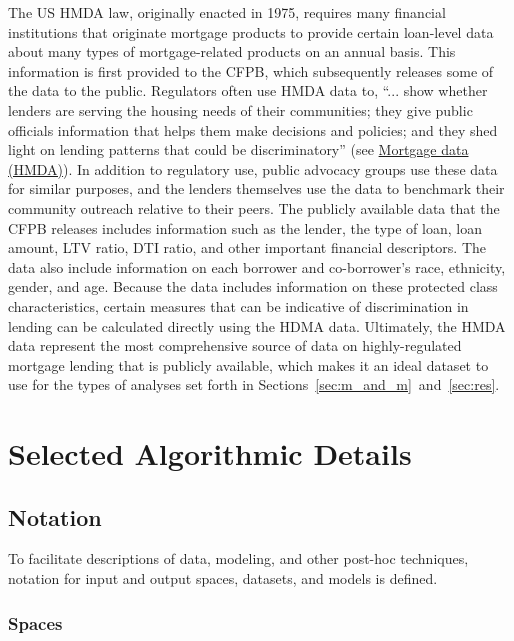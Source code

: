 \documentclass[information,article,accept,moreauthors,pdftex]{Definitions/mdpi}
\begin{document}
The US HMDA law, originally enacted in 1975, requires many financial institutions that originate mortgage products to provide certain loan-level data about many types of mortgage-related products on an annual basis. This information is first provided to the CFPB, which subsequently releases some of the data to the public. Regulators often use HMDA data to, ``... show whether lenders are serving the housing needs of their communities; they give public officials information that helps them make decisions and policies; and they shed light on lending patterns that could be discriminatory'' (see \href{https://www.consumerfinance.gov/data-research/hmda/}{Mortgage data (HMDA)}). In addition to regulatory use, public advocacy groups use these data for similar purposes, and the lenders themselves use the data to benchmark their community outreach relative to their peers.  The publicly available data that the CFPB releases includes information such as the lender, the type of loan, loan amount, LTV ratio, DTI ratio, and other important financial descriptors. The data also include information on each borrower and co-borrower’s race, ethnicity, gender, and age. Because the data includes information on these protected class characteristics, certain measures that can be indicative of discrimination in lending can be calculated directly using the HDMA data. Ultimately, the HMDA data represent the most comprehensive source of data on highly-regulated mortgage lending that is publicly available, which makes it an ideal dataset to use for the types of analyses set forth in Sections~\ref{sec:m_and_m}~and~\ref{sec:res}.  

\section{Selected Algorithmic Details}\label{a_sec:algo}
\vspace{-6pt}

\subsection{Notation}\label{a_ssec:not}

To facilitate descriptions of data, modeling, and other post-hoc techniques, notation for input and output spaces, datasets, and models is defined.

\subsubsection{Spaces} 
\end{document}
